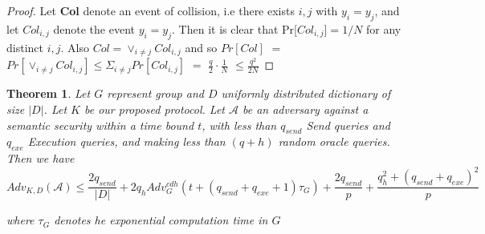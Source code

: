 \documentclass[a4paper,12pt]{report}
\newtheorem{theorem}{Theorem}
\begin{document}
\begin{proof}
Let \textbf{Col} denote an event of collision, i.e there exists $i,
j$ with $y_i = y_j$, and let \textbf{$Col_{i, j}$} denote the event
$y_i = y_j$. Then it is clear that Pr[\textbf{$Col_{i, j}$}]$ = 1/N$
for any distinct $i, j$. Also $Col =  \vee_{i \neq j}Col_{i, j}$ and
so $Pr[Col]$ $=$ $Pr[\vee_{i \neq j}Col_{i, j}] \leq \Sigma_{i \neq
j}Pr[Col_{i, j}]$ $=$ $\frac{q}{2}\cdot\frac{1}{N}$ $\leq
\frac{q^2}{2N}$
\end{proof}

\begin{theorem}
Let $G$ represent group and $D$ uniformly distributed dictionary of
size $|D|$. Let $K$ be our proposed protocol. Let $\mathcal{A}$ be
an adversary against a semantic security within a time bound $t$,
with less than $q_{send}$ Send queries and $q_{exe}$ Execution
queries, and making less than $(q+h)$ random oracle queries. Then we
have
\begin{equation}\label{eq1}

Adv_{K, D}(\mathcal{A}) \leq \frac{2q_{send}}{|D|} + 2q_h
Adv_G^{cdh}(t+(q_{send}+ q_{exe}+1)\tau_{G}) + \frac{2q_{send}}{p}+
\frac{q_h^2 + (q_{send} +q_{exe})^2}{p}
\end{equation}

where $\tau_{G}$ denotes he exponential computation time in $G$
\end{theorem}
\end{document}
